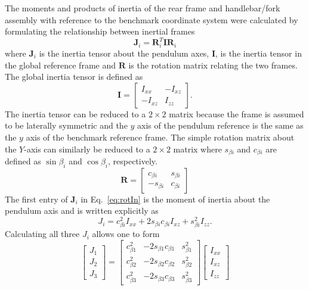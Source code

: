 \documentclass{bmd2010p}
\begin{document}
The moments and products of inertia of the rear frame and handlebar/fork
assembly with reference to the benchmark coordinate system were calculated by
formulating the relationship between inertial frames
\begin{equation}
	\mathbf{J}_i=\mathbf{R}_i^T\mathbf{IR}_i
\label{eq:rotIn}
\end{equation}
where $\mathbf{J}_i$ is the inertia tensor about the pendulum axes,
$\mathbf{I}$, is the inertia tensor in the global reference frame and
$\mathbf{R}$ is the rotation matrix relating the two frames. The global inertia
tensor is defined as
\begin{equation}
	\mathbf{I}=
	\left[
	\begin{array}{rr}
		I_{xx}  & -I_{xz}\\
		-I_{xz} & I_{zz}
	\end{array}
	\right]\textrm{.}
	\label{eq:MoI}
\end{equation}
The inertia tensor can be reduced to a $2\times2$ matrix because the frame is
assumed to be laterally symmetric and the $y$ axis of the pendulum reference is
the same as the $y$ axis of the benchmark reference frame. The simple rotation matrix about the $Y$-axis
can similarly be reduced to a $2\times2$ matrix where $s_{\beta i}$ and
$c_{\beta i}$ are defined as $\sin{\beta_i}$ and $\cos{\beta_i}$,
respectively.
\begin{equation}
	\mathbf{R}=
	\left[
	\begin{array}{rr}
		c_{\beta i} & s_{\beta i}\\
		-s_{\beta i} & c_{\beta i}
	\end{array}
	\right]
	\label{eq:rotMat}
\end{equation}
The first entry of $\mathbf{J}_i$ in Eq.~\ref{eq:rotIn} is the moment of inertia about the pendulum axis and is written explicitly as 
\begin{equation}
	J_{i}=c^{2}_{\beta i}I_{xx}+2s_{\beta i}c_{\beta i}I_{xz}+s^{2}_{\beta i}I_{zz}\textrm{.}
\label{eq:inRelComp}
\end{equation}
Calculating all three $J_{i}$ allows one to form
\begin{equation}
	\left[
	\begin{array}{c}
		J_{1}\\
		J_{2}\\
		J_{3}
	\end{array}
	\right]
	=
	\left[
	\begin{array}{ccc}
		c_{\beta 1}^2 & -2s_{\beta 1}c_{\beta 1} & s_{\beta 1}^2\\
		c_{\beta 2}^2 & -2s_{\beta 2}c_{\beta 2} & s_{\beta 2}^2\\
		c_{\beta 3}^2 & -2s_{\beta 3}c_{\beta 3} & s_{\beta 3}^2
	\end{array}
	\right]
	\left[
	\begin{array}{c}
		I_{xx}\\
		I_{xz}\\
		I_{zz}
	\end{array}
	\right]
\label{eq:inRel}
\end{equation}
\end{document}

